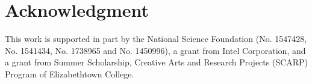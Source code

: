\section*{Acknowledgment}
This work is supported in part by the National Science Foundation (No. 1547428, No. 1541434, No. 1738965 and No. 1450996), a grant from Intel Corporation, and a grant from Summer Scholarship, Creative Arts and Research Projects (SCARP) Program of Elizabethtown College. 
